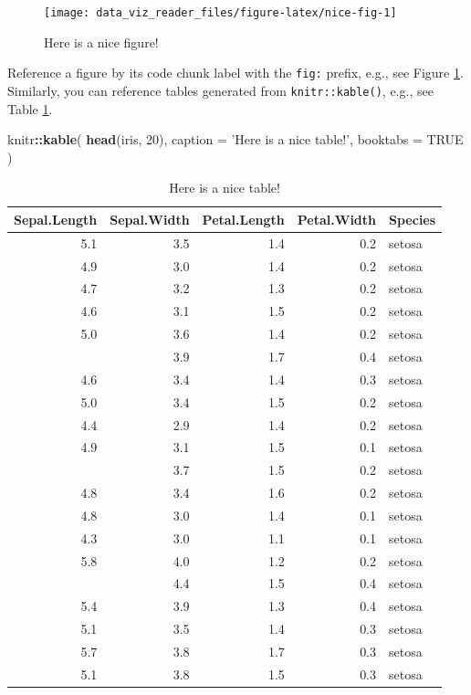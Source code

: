 \documentclass[]{book}
\newenvironment{Shaded}{\begin{snugshade}}{\end{snugshade}}
\newcommand{\DataTypeTok}[1]{\textcolor[rgb]{0.13,0.29,0.53}{#1}}
\newcommand{\DecValTok}[1]{\textcolor[rgb]{0.00,0.00,0.81}{#1}}
\newcommand{\KeywordTok}[1]{\textcolor[rgb]{0.13,0.29,0.53}{\textbf{#1}}}
\newcommand{\NormalTok}[1]{#1}
\newcommand{\OperatorTok}[1]{\textcolor[rgb]{0.81,0.36,0.00}{\textbf{#1}}}
\newcommand{\OtherTok}[1]{\textcolor[rgb]{0.56,0.35,0.01}{#1}}
\newcommand{\StringTok}[1]{\textcolor[rgb]{0.31,0.60,0.02}{#1}}
\begin{document}
\begin{figure}

{\centering \texttt{[image: data\_viz\_reader\_files/figure-latex/nice-fig-1]} 

}

\caption{Here is a nice figure!}\label{fig:nice-fig}
\end{figure}

Reference a figure by its code chunk label with the \texttt{fig:} prefix, e.g., see Figure \ref{fig:nice-fig}. Similarly, you can reference tables generated from \texttt{knitr::kable()}, e.g., see Table \ref{tab:nice-tab}.

\begin{Shaded}
\begin{Highlighting}[]
\NormalTok{knitr}\OperatorTok{::}\KeywordTok{kable}\NormalTok{(}
 \KeywordTok{head}\NormalTok{(iris, }\DecValTok{20}\NormalTok{), }\DataTypeTok{caption =} \StringTok{'Here is a nice table!'}\NormalTok{,}
 \DataTypeTok{booktabs =} \OtherTok{TRUE}
\NormalTok{)}
\end{Highlighting}
\end{Shaded}

\begin{table}[t]

\caption{\label{tab:nice-tab}Here is a nice table!}
\centering
\begin{tabular}{rrrrl}
\toprule
Sepal.Length & Sepal.Width & Petal.Length & Petal.Width & Species\\
\midrule
5.1 & 3.5 & 1.4 & 0.2 & setosa\\
4.9 & 3.0 & 1.4 & 0.2 & setosa\\
4.7 & 3.2 & 1.3 & 0.2 & setosa\\
4.6 & 3.1 & 1.5 & 0.2 & setosa\\
5.0 & 3.6 & 1.4 & 0.2 & setosa\\
\addlinespace
5.4 & 3.9 & 1.7 & 0.4 & setosa\\
4.6 & 3.4 & 1.4 & 0.3 & setosa\\
5.0 & 3.4 & 1.5 & 0.2 & setosa\\
4.4 & 2.9 & 1.4 & 0.2 & setosa\\
4.9 & 3.1 & 1.5 & 0.1 & setosa\\
\addlinespace
5.4 & 3.7 & 1.5 & 0.2 & setosa\\
4.8 & 3.4 & 1.6 & 0.2 & setosa\\
4.8 & 3.0 & 1.4 & 0.1 & setosa\\
4.3 & 3.0 & 1.1 & 0.1 & setosa\\
5.8 & 4.0 & 1.2 & 0.2 & setosa\\
\addlinespace
5.7 & 4.4 & 1.5 & 0.4 & setosa\\
5.4 & 3.9 & 1.3 & 0.4 & setosa\\
5.1 & 3.5 & 1.4 & 0.3 & setosa\\
5.7 & 3.8 & 1.7 & 0.3 & setosa\\
5.1 & 3.8 & 1.5 & 0.3 & setosa\\
\bottomrule
\end{tabular}
\end{table}
\end{document}
